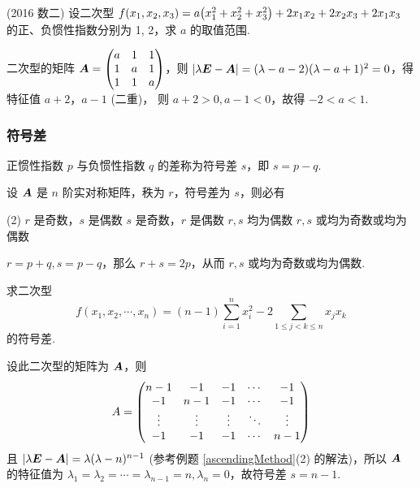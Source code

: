 \begin{example}
    (2016 数二) 设二次型 $f(x_1,x_2,x_3)=a\qty(x_1^2+x_2^2+x_3^2)+2x_1x_2+2x_2x_3+2x_1x_3$ 的正、负惯性指数分别为 1, 2，求 $a$ 的取值范围.
\end{example}
\begin{solution}
    二次型的矩阵 $\vb*{A}=\mqty(a&1&1\\1&a&1\\1&1&a)$，则 $|\lambda\vb*{E}-\vb*{A}|=(\lambda-a-2)(\lambda-a+1)^2=0$，得特征值 $a+2$，$a-1$ (二重)，
    则 $a+2>0,a-1<0$，故得 $-2<a<1.$
\end{solution}

\subsubsection{符号差}

\begin{definition}[符号差]
    正惯性指数 $p$ 与负惯性指数 $q$ 的差称为符号差 $s$，即 $s=p-q.$
\end{definition}

\begin{example}
    设 $\vb*{A}$ 是 $n$ 阶实对称矩阵，秩为 $r$，符号差为 $s$，则必有
    \begin{tasks}(2)
        \task $r$ 是奇数，$s$ 是偶数
        \task $s$ 是奇数，$r$ 是偶数
        \task $r,s$ 均为偶数
        \task $r,s$ 或均为奇数或均为偶数
    \end{tasks}
\end{example}
\begin{solution}
    $r=p+q,s=p-q$，那么 $r+s=2p$，从而 $r,s$ 或均为奇数或均为偶数.
\end{solution}

\begin{example}
    求二次型 $$\displaystyle f(x_1,x_2,\cdots,x_n)=(n-1)\sum_{i=1}^{n}x_i^2-2\sum_{1\leqslant j<k\leqslant n}x_jx_k$$
    的符号差.
\end{example}
\begin{solution}
    设此二次型的矩阵为 $\vb*{A}$，则 $$A=\mqty(n-1&-1&-1&\cdots&-1\\-1&n-1&-1&\cdots&-1\\\vdots& \vdots& \vdots& \ddots & \vdots\\-1&-1&-1&\cdots&n-1)$$
    且 $|\lambda\vb*{E}-\vb*{A}|=\lambda(\lambda-n)^{n-1}$ (参考例题 \ref{ascendingMethod}(2) 的解法)，所以 $\vb*{A}$ 的特征值为 $\lambda_1=\lambda_2=\cdots=\lambda_{n-1}=n,\lambda_n=0$，故符号差 $s=n-1.$
\end{solution}


